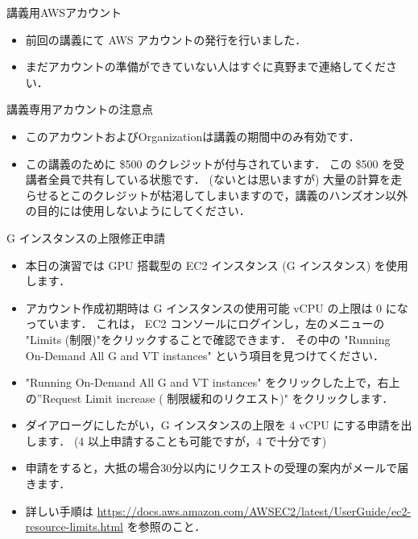 \documentclass[unicode,11pt]{beamer}
\begin{document}
\begin{frame}{講義用AWSアカウント}
\begin{itemize}
    \item 前回の講義にて AWS アカウントの発行を行いました．
    \item まだアカウントの準備ができていない人はすぐに真野まで連絡してください．
\end{itemize}

\end{frame}

\begin{frame}{講義専用アカウントの注意点}

\begin{itemize}
    \item このアカウントおよびOrganizationは講義の期間中のみ有効です．
    \item この講義のために \$500 のクレジットが付与されています．
    この \$500 を受講者全員で共有している状態です．
    (ないとは思いますが) 大量の計算を走らせるとこのクレジットが枯渇してしまいますので，講義のハンズオン以外の目的には使用しないようにしてください．
\end{itemize}

\end{frame}

\begin{frame}{G インスタンスの上限修正申請}

\begin{itemize}
    \item 本日の演習では GPU 搭載型の EC2 インスタンス (G インスタンス) を使用します．
    \item アカウント作成初期時は G インスタンスの使用可能 vCPU の上限は 0 になっています．
    これは， EC2 コンソールにログインし，左のメニューの "Limits (制限)"をクリックすることで確認できます．
    その中の "Running On-Demand All G and VT instances" という項目を見つけてください．
    \item "Running On-Demand All G and VT instances" をクリックした上で，右上の”Request Limit increase (
    制限緩和のリクエスト)" をクリックします．
    \item ダイアローグにしたがい，G インスタンスの上限を 4 vCPU にする申請を出します．
    (4 以上申請することも可能ですが，4 で十分です)
    \item 申請をすると，大抵の場合30分以内にリクエストの受理の案内がメールで届きます．
    \item 詳しい手順は
    \url{https://docs.aws.amazon.com/AWSEC2/latest/UserGuide/ec2-resource-limits.html}
    を参照のこと．
\end{itemize}

\end{frame}
\end{document}
